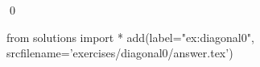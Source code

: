 
\begin{ex} 
  \label{ex:diagonal0}
  
  \qed
\end{ex} 
\begin{python0}
from solutions import *
add(label="ex:diagonal0",
    srcfilename='exercises/diagonal0/answer.tex') 
\end{python0}
